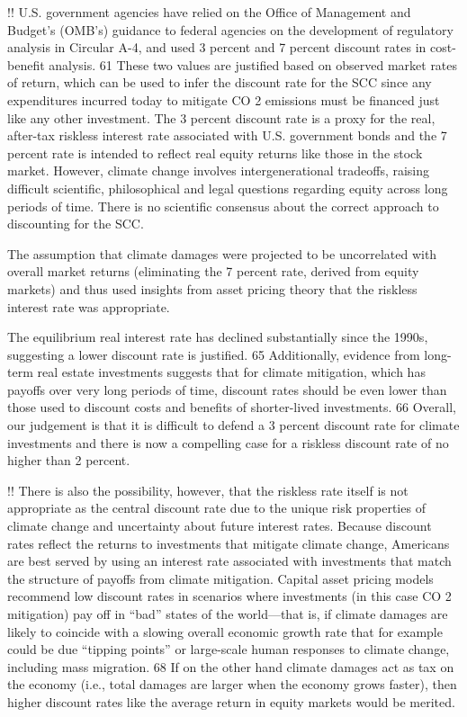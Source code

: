 \documentclass[
]{book}
\begin{document}
!!
U.S. government agencies have relied on the Office of Management and
Budget's (OMB's) guidance to federal agencies on the development of regulatory
analysis in Circular A-4, and used 3 percent and 7 percent discount rates in cost-benefit
analysis. 61 These two values are justified based on observed market rates of return,
which can be used to infer the discount rate for the SCC since any expenditures
incurred today to mitigate CO 2 emissions must be financed just like any other
investment. The 3 percent discount rate is a proxy for the real, after-tax riskless interest
rate associated with U.S. government bonds and the 7 percent rate is intended to reflect
real equity returns like those in the stock market. However, climate change involves
intergenerational tradeoffs, raising difficult scientific, philosophical and legal questions
regarding equity across long periods of time. There is no scientific consensus about the
correct approach to discounting for the SCC.

The assumption that climate damages were projected to be uncorrelated with overall market
returns (eliminating the 7 percent rate, derived from equity markets) and thus used
insights from asset pricing theory that the riskless interest rate was appropriate.

The equilibrium real interest rate has declined substantially since the 1990s,
suggesting a lower discount rate is justified. 65 Additionally, evidence from long-term real
estate investments suggests that for climate mitigation, which has payoffs over very long
periods of time, discount rates should be even lower than those used to discount costs
and benefits of shorter-lived investments. 66 Overall, our judgement is that it is difficult
to defend a 3 percent discount rate for climate investments and there is now a
compelling case for a riskless discount rate of no higher than 2 percent.

!!
There is also the possibility, however, that the riskless rate itself is not appropriate as
the central discount rate due to the unique risk properties of climate change and
uncertainty about future interest rates. Because discount rates reflect the returns to
investments that mitigate climate change, Americans are best served by using an
interest rate associated with investments that match the structure of payoffs from
climate mitigation. Capital asset pricing models recommend low discount rates in
scenarios where investments (in this case CO 2 mitigation) pay off in ``bad'' states of the
world---that is, if climate damages are likely to coincide with a slowing overall economic
growth rate that for example could be due ``tipping points'' or large-scale human
responses to climate change, including mass migration. 68 If on the other hand climate
damages act as tax on the economy (i.e., total damages are larger when the economy
grows faster), then higher discount rates like the average return in equity markets would
be merited.
\end{document}
